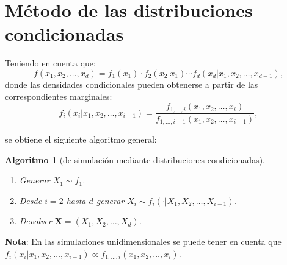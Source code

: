 \documentclass[
]{book}
\theoremstyle{break}
\newtheorem{conjecture}{Algoritmo}[chapter]
\theoremstyle{nonumberplain}
\begin{document}
\hypertarget{distrcond}{%
\section{Método de las distribuciones condicionadas}\label{distrcond}}

Teniendo en cuenta que:
\[f\left( x_1,x_2,\ldots,x_d\right)  =f_1\left( x_1\right)  \cdot
f_2\left( x_2|x_1\right)  \cdots f_d\left( x_d|x_1,x_2,\ldots,x_{d-1}\right),\]
donde las densidades condicionales pueden obtenerse a partir de las
correspondientes marginales:
\[f_i\left( x_i|x_1,x_2,\ldots,x_{i-1}\right)  =\frac{f_{1,\ldots
,i}\left( x_1,x_2,\ldots,x_i\right)  }{f_{1,\ldots,i-1}\left(
x_1,x_2,\ldots,x_{i-1}\right)},\]

se obtiene el siguiente algoritmo general:

\begin{conjecture}[de simulación mediante distribuciones condicionadas]
\protect\hypertarget{cnj:mult-distrcond}{}\label{cnj:mult-distrcond}\leavevmode

\begin{enumerate}
\def\labelenumi{\arabic{enumi}.}
\item
  Generar \(X_1 \sim f_1\).
\item
  Desde \(i=2\) hasta \(d\) generar
  \(X_i \sim f_i\left( \cdot|X_1,X_2,\ldots,X_{i-1}\right)\).
\item
  Devolver \(\mathbf{X} =\left( X_1,X_2,\ldots,X_d\right)\).
\end{enumerate}

\end{conjecture}

\textbf{Nota}: En las simulaciones unidimensionales se puede tener en cuenta que
\(f_i\left( x_i|x_1,x_2,\ldots,x_{i-1}\right) \propto f_{1,\ldots,i}\left( x_1,x_2,\ldots,x_i\right)\).
\end{document}
